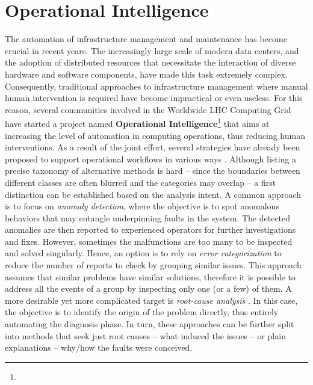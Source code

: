 \chapter{Operational Intelligence} \label{ch:opint}
The automation of infrastructure management and maintenance has become crucial in recent years. 
The increasingly large scale of modern data centers, and the adoption of distributed resources that necessitate the interaction of diverse hardware and software components, have made this task extremely complex. Consequently, traditional approaches to infrastructure management where manual human intervention is required have become impractical or even useless. 
For this reason, several communities involved in the Worldwide LHC Computing Grid have started a project named \textbf{Operational Intelligence}\footnote{\opint} that aims at increasing the level of automation in computing operations, thus reducing human interventions.
As a result of the joint effort, 
several strategies have already been proposed to support operational workflows in various ways \cite{opint2020, opint2022, decker2020powerquality, diotalevi2019elk}.
Although listing a precise taxonomy of alternative methods is hard -- since the boundaries between different classes are often blurred and the categories may overlap -- a first distinction can be established based on the analysis intent.
A common approach is to focus on \textit{anomaly detection}, where the objective is to spot anomalous behaviors that may entangle underpinning faults in the system. The detected anomalies are then reported to experienced operators for further investigations and fixes.
However, sometimes the malfunctions are too many to be inspected and solved singularly. Hence, an option is to rely on \textit{error categorization} to reduce the number of reports to check by grouping similar issues. This approach assumes that similar problems have similar solutions, therefore it is possible to address all the events of a group by inspecting only one (or a few) of them.
A more desirable yet more complicated target is \textit{root-cause analysis} \cite{sole2017survey}. In this case, the objective is to identify the origin of the problem directly, thus entirely automating the diagnosis phase.
In turn, these approaches can be further split into methods that seek just root causes -- what induced the issues -- or plain explanations -- why/how the faults were conceived.

